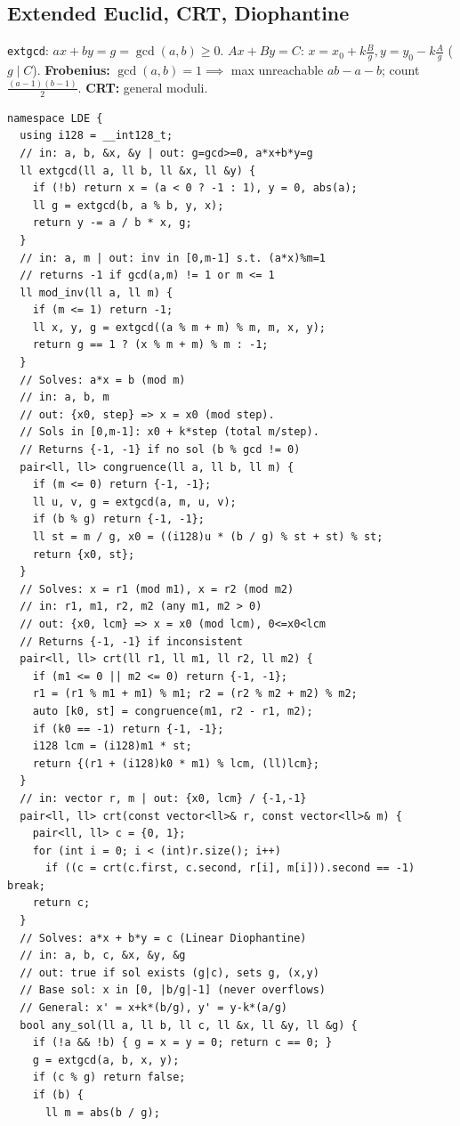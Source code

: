 \subsection{Extended Euclid, CRT, Diophantine}
\texttt{extgcd}: $ax+by=g=\gcd(a,b)\ge 0$. $Ax+By=C$: $x=x_0+k\frac{B}{g}, y=y_0-k\frac{A}{g}$ ($g\mid C$). \textbf{Frobenius:} $\gcd(a,b)=1\implies$ max unreachable $ab-a-b$; count $\frac{(a-1)(b-1)}{2}$. \textbf{CRT:} general moduli.
\begin{verbatim}
namespace LDE {
  using i128 = __int128_t;
  // in: a, b, &x, &y | out: g=gcd>=0, a*x+b*y=g
  ll extgcd(ll a, ll b, ll &x, ll &y) {
    if (!b) return x = (a < 0 ? -1 : 1), y = 0, abs(a);
    ll g = extgcd(b, a % b, y, x);
    return y -= a / b * x, g;
  }
  // in: a, m | out: inv in [0,m-1] s.t. (a*x)%m=1
  // returns -1 if gcd(a,m) != 1 or m <= 1
  ll mod_inv(ll a, ll m) {
    if (m <= 1) return -1;
    ll x, y, g = extgcd((a % m + m) % m, m, x, y);
    return g == 1 ? (x % m + m) % m : -1;
  }
  // Solves: a*x = b (mod m)
  // in: a, b, m
  // out: {x0, step} => x = x0 (mod step).
  // Sols in [0,m-1]: x0 + k*step (total m/step).
  // Returns {-1, -1} if no sol (b % gcd != 0)
  pair<ll, ll> congruence(ll a, ll b, ll m) {
    if (m <= 0) return {-1, -1};
    ll u, v, g = extgcd(a, m, u, v);
    if (b % g) return {-1, -1};
    ll st = m / g, x0 = ((i128)u * (b / g) % st + st) % st;
    return {x0, st};
  }
  // Solves: x = r1 (mod m1), x = r2 (mod m2)
  // in: r1, m1, r2, m2 (any m1, m2 > 0)
  // out: {x0, lcm} => x = x0 (mod lcm), 0<=x0<lcm
  // Returns {-1, -1} if inconsistent
  pair<ll, ll> crt(ll r1, ll m1, ll r2, ll m2) {
    if (m1 <= 0 || m2 <= 0) return {-1, -1};
    r1 = (r1 % m1 + m1) % m1; r2 = (r2 % m2 + m2) % m2;
    auto [k0, st] = congruence(m1, r2 - r1, m2);
    if (k0 == -1) return {-1, -1};
    i128 lcm = (i128)m1 * st;
    return {(r1 + (i128)k0 * m1) % lcm, (ll)lcm};
  }
  // in: vector r, m | out: {x0, lcm} / {-1,-1}
  pair<ll, ll> crt(const vector<ll>& r, const vector<ll>& m) {
    pair<ll, ll> c = {0, 1};
    for (int i = 0; i < (int)r.size(); i++)
      if ((c = crt(c.first, c.second, r[i], m[i])).second == -1) break;
    return c;
  }
  // Solves: a*x + b*y = c (Linear Diophantine)
  // in: a, b, c, &x, &y, &g
  // out: true if sol exists (g|c), sets g, (x,y)
  // Base sol: x in [0, |b/g|-1] (never overflows)
  // General: x' = x+k*(b/g), y' = y-k*(a/g)
  bool any_sol(ll a, ll b, ll c, ll &x, ll &y, ll &g) {
    if (!a && !b) { g = x = y = 0; return c == 0; }
    g = extgcd(a, b, x, y);
    if (c % g) return false;
    if (b) {
      ll m = abs(b / g);

\end{verbatim}
